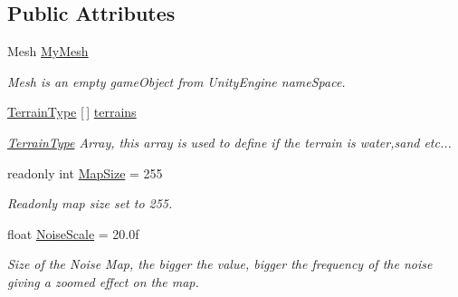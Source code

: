 \subsection*{Public Attributes}
\begin{DoxyCompactItemize}
\item 
\mbox{\label{class_assets_1_1_scripts_1_1_mesh_generation_a26596b6ee02d4e1a561c9fa9301d98b3}} 
Mesh \mbox{\hyperlink{class_assets_1_1_scripts_1_1_mesh_generation_a26596b6ee02d4e1a561c9fa9301d98b3}{My\+Mesh}}
\begin{DoxyCompactList}\small\item\em Mesh is an empty game\+Object from Unity\+Engine name\+Space. \end{DoxyCompactList}\item 
\mbox{\label{class_assets_1_1_scripts_1_1_mesh_generation_aab609831d408b234a7999a66e7caa0b8}} 
\mbox{\hyperlink{struct_assets_1_1_scripts_1_1_terrain_type}{Terrain\+Type}} \mbox{[}$\,$\mbox{]} \mbox{\hyperlink{class_assets_1_1_scripts_1_1_mesh_generation_aab609831d408b234a7999a66e7caa0b8}{terrains}}
\begin{DoxyCompactList}\small\item\em \mbox{\hyperlink{struct_assets_1_1_scripts_1_1_terrain_type}{Terrain\+Type}} Array, this array is used to define if the terrain is water,sand etc... \end{DoxyCompactList}\item 
\mbox{\label{class_assets_1_1_scripts_1_1_mesh_generation_ab5bab0bbdf58ab515b5436ab0ff78783}} 
readonly int \mbox{\hyperlink{class_assets_1_1_scripts_1_1_mesh_generation_ab5bab0bbdf58ab515b5436ab0ff78783}{Map\+Size}} = 255
\begin{DoxyCompactList}\small\item\em Readonly map size set to 255. \end{DoxyCompactList}\item 
\mbox{\label{class_assets_1_1_scripts_1_1_mesh_generation_a1867a959235c198871e5933c0aaf170b}} 
float \mbox{\hyperlink{class_assets_1_1_scripts_1_1_mesh_generation_a1867a959235c198871e5933c0aaf170b}{Noise\+Scale}} = 20.\+0f
\begin{DoxyCompactList}\small\item\em Size of the Noise Map, the bigger the value, bigger the frequency of the noise giving a zoomed effect on the map. \end{DoxyCompactList}\item 

\end{DoxyCompactItemize}
